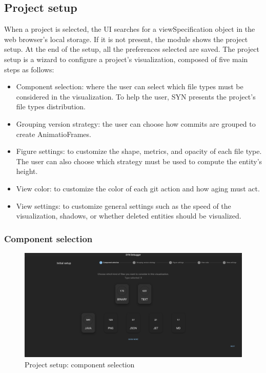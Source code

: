 \subsection{Project setup}
When a project is selected, the UI searches for a viewSpecification object in the web browser's local storage. 
If it is not present, the module shows the project setup. At the end of the setup, all the preferences selected are saved. 
The project setup is a wizard to configure a project's visualization, composed of five main steps as follows:
\begin{itemize}
    \item Component selection: where the user can select which file types must be considered in the visualization. To help the user, SYN presents the project's file types distribution.
    \item Grouping version strategy: the user can choose how commits are grouped to create AnimatioFrames.
    \item Figure settings: to customize the shape, metrics, and opacity of each file type. The user can also choose which strategy must be used to compute the entity's height. 
    \item View color: to customize the color of each git action and how aging must act. 
    \item View settings: to customize general settings such as the speed of the visualization, shadows, or whether deleted entities should be visualized. 
\end{itemize}

\newpage
\subsubsection*{Component selection}

\begin{figure}[h]
    \center
    \includegraphics[width=\textwidth]{SYNUI-settings1.png}
    \caption{Project setup: component selection}
    \label{fig:SYNUIsettings1}
\end{figure}

